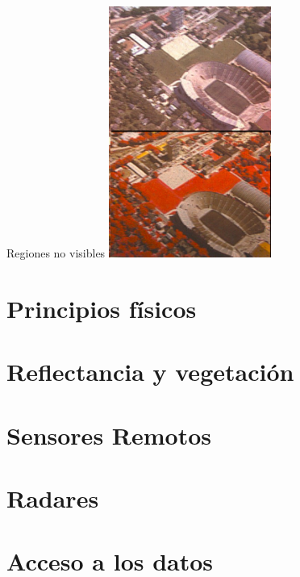 \documentclass{beamer}
\begin{document}
\begin{frame}{Regiones no visibles}
	\centering
	\includegraphics[width=0.4\textwidth]{IMGs/VISNIR}
\end{frame}



\section{Principios físicos}

\section{Reflectancia y vegetación}

\section{Sensores Remotos}

\section{Radares}

\section{Acceso a los datos}
\end{document}
